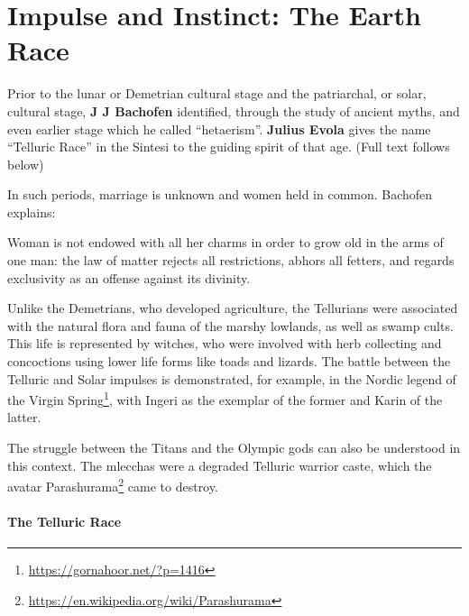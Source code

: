 \section{Impulse and Instinct: The Earth Race}

Prior to the lunar or Demetrian cultural stage and the patriarchal, or solar, cultural stage, \textbf{J J Bachofen} identified, through the study of ancient myths, and even earlier stage which he called ``hetaerism''. \textbf{Julius Evola} gives the name ``Telluric Race'' in the Sintesi to the guiding spirit of that age. (Full text follows below)

In such periods, marriage is unknown and women held in common. Bachofen explains:

\begin{quotex}
Woman is not endowed with all her charms in order to grow old in the arms of one man: the law of matter rejects all restrictions, abhors all fetters, and regards exclusivity as an offense against its divinity.
\end{quotex}


Unlike the Demetrians, who developed agriculture, the Tellurians were associated with the natural flora and fauna of the marshy lowlands, as well as swamp cults. This life is represented by witches, who were involved with herb collecting and concoctions using lower life forms like toads and lizards. The battle between the Telluric and Solar impulses is demonstrated, for example, in the Nordic legend of the Virgin Spring\footnote{\url{https://gornahoor.net/?p=1416}}, with Ingeri as the exemplar of the former and Karin of the latter.

The struggle between the Titans and the Olympic gods can also be understood in this context. The mlecchas were a degraded Telluric warrior caste, which the avatar Parashurama\footnote{\url{https://en.wikipedia.org/wiki/Parashurama}} came to destroy.

\paragraph{The Telluric Race}


